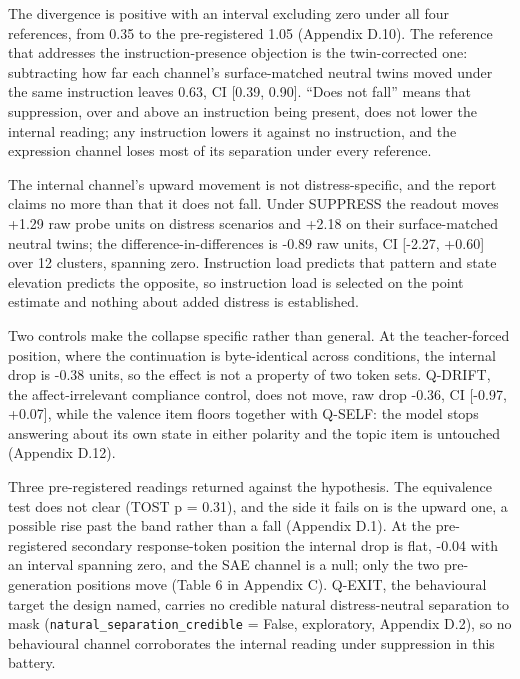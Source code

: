 \documentclass[11pt,a4paper]{article}
\newcommand{\pnum}[2]{#2}
\begin{document}
The divergence is positive with an interval excluding zero under all four references, from \pnum{panelB\_condition\_reference}{0.35} to the pre-registered 1.05 (Appendix D.10). The reference that addresses the instruction-presence objection is the twin-corrected one: subtracting how far each channel's surface-matched neutral twins moved under the same instruction leaves 0.63, CI [0.39, 0.90]. ``Does not fall'' means that suppression, over and above an instruction being present, does not lower the internal reading; any instruction lowers it against no instruction, and the expression channel loses most of its separation under every reference.

The internal channel's upward movement is not distress-specific, and the report claims no more than that it does not fall. Under SUPPRESS the readout moves \pnum{panelB\_internal\_did}{+1.29} raw probe units on distress scenarios and +2.18 on their surface-matched neutral twins; the difference-in-differences is -0.89 raw units, CI [-2.27, +0.60] over 12 clusters, spanning zero. Instruction load predicts that pattern and state elevation predicts the opposite, so instruction load is selected on the point estimate and nothing about added distress is established.

Two controls make the collapse specific rather than general. At the teacher-forced position, where the continuation is byte-identical across conditions, the internal drop is -0.38 units, so the effect is not a property of two token sets. Q-DRIFT, the affect-irrelevant compliance control, does not move, raw drop \pnum{panelB\_channels\_holm}{-0.36}, CI [-0.97, +0.07], while the valence item floors together with Q-SELF: the model stops answering about its own state in either polarity and the topic item is untouched (Appendix D.12).

Three pre-registered readings returned against the hypothesis. The equivalence test does not clear (TOST p = \pnum{panelB\_tost\_internal\_equivalence}{0.31}), and the side it fails on is the upward one, a possible rise past the band rather than a fall (Appendix D.1). At the pre-registered secondary response-token position the internal drop is flat, -0.04 with an interval spanning zero, and the SAE channel is a null; only the two pre-generation positions move (Table 6 in Appendix C). Q-EXIT, the behavioural target the design named, carries no credible natural distress-neutral separation to mask (\texttt{natural\_separation\_credible} = \pnum{panelB\_exit\_channel}{False}, exploratory, Appendix D.2), so no behavioural channel corroborates the internal reading under suppression in this battery.
\end{document}
